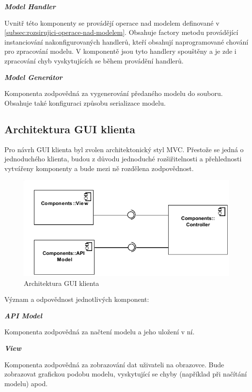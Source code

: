 \documentclass[11pt,twoside,a4paper]{book}
\begin{document}
\textbf{\textit{Model Handler}}

Uvnitř této komponenty se provádějí operace nad modelem definované v
\ref{subsec:rozsirujici-operace-nad-modelem}.
Obsahuje factory metodu provádějící instanciování nakonfigurovaných handlerů,
kteří obsahují naprogramované chování pro zpracování modelu. V komponentě jsou
tyto handlery spouštěny a je zde i zpracování chyb vyskytujících se během
provádění handlerů.

\textbf{\textit{Model Generátor}}

Komponenta zodpovědná za vygenerování předaného modelu do souboru. Obsahuje také
konfiguraci způsobu serializace modelu.

\subsection{Architektura GUI klienta}
\label{subsec:architejtura-gui}

Pro návrh GUI klienta byl zvolen architektonický styl MVC.
Přestože se jedná o jednoduchého klienta, budou z důvodu jednoduché
rozšiřitelnosti a přehlednosti vytvářeny komponenty a bude mezi ně rozdělena
zodpovědnost.

\begin{figure}[h]
\begin{center}
\includegraphics[width=13cm]{images-pdf/GUIClient.pdf}
\caption{Architektura GUI klienta}
\label{fig:architektura-gui}
\end{center}
\end{figure}

Význam a odpovědnost jednotlivých komponent:

\textbf{\textit{API Model}}

Komponenta zodpovědná za načtení modelu a jeho uložení v ní.

\textbf{\textit{View}}

Komponenta zodpovědná za zobrazování dat uživateli na obrazovce. Bude zobrazovat
grafickou podobu modelu, vyskytující se chyby (například při načítání modelu) apod.
\end{document}
